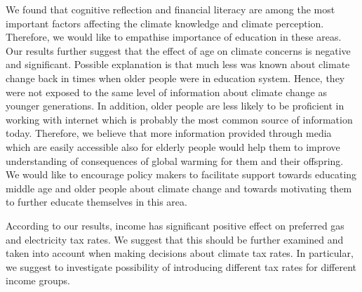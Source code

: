\documentclass[a4paper,12pt]{article}
\begin{document}
We found that cognitive reflection and financial literacy are among the most important factors affecting the climate knowledge and climate perception. Therefore, we would like to empathise importance of education in these areas. Our results further suggest that the effect of age on climate concerns is negative and significant. Possible explanation is that much less was known about climate change back in times when older people were in education system. Hence, they were not exposed to the same level of information about climate change as younger generations. In addition, older people are less likely to be proficient in working with internet which is probably the most common source of information today. Therefore, we believe that more information provided through media which are easily accessible also for elderly people would help them to improve understanding of consequences of global warming for them and their offspring. We would like to encourage policy makers to facilitate support towards educating middle age and older people about climate change and towards motivating them to further educate themselves in this area.





According to our results, income has significant positive effect on preferred gas and electricity tax rates. We suggest that this should be further examined and taken into account when making decisions about climate tax rates. In particular, we suggest to investigate possibility of introducing different tax rates for different income groups.





















\makeatletter 
\renewcommand{\thesection}{\hspace*{-1.0em}}
\newpage
\linespread{1}


\end{document}

